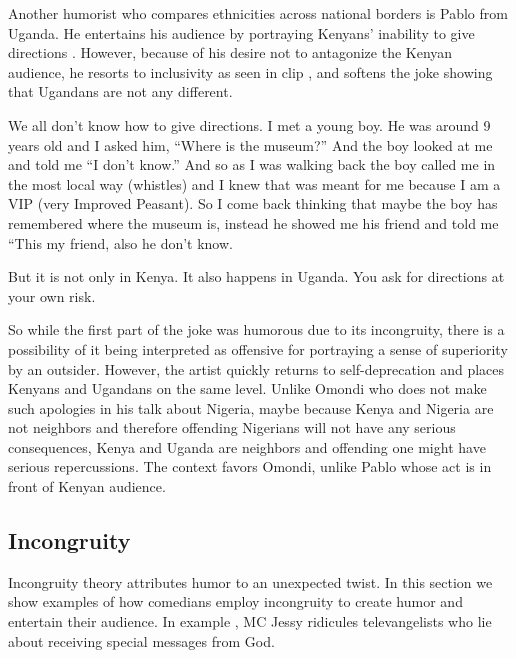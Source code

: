 \documentclass[output=paper]{langsci/langscibook}
\begin{document}
Another humorist who compares ethnicities across national borders is Pablo from Uganda. He entertains his audience by portraying Kenyans’ inability to give directions . However, because of his desire not to antagonize the Kenyan audience, he resorts to inclusivity as seen in clip , and softens the joke showing that Ugandans are not any different.

\ea\label{ex:muaka:6}
We all don’t know how to give directions. I met a young boy. He was around 9 years old and I asked him, “Where is the museum?” And the boy looked at me and told me “I don’t know.” And so as I was walking back the boy called me in the most local way \textup{(whistles)} and I knew that was meant for me because I am a VIP (very Improved Peasant). So I come back thinking that maybe the boy has remembered where the museum is, instead he showed me his friend and told me “This my friend, also he don’t know. 
\citep{Omogi2012}
\z

\ea\label{ex:muaka:7}
 But it is not only in Kenya. It also happens in Uganda. You ask for directions at your own risk. 
 \citep{Omogi2012}
\z

So while the first part of the joke was humorous due to its incongruity, there is a possibility of it being interpreted as offensive for portraying a sense of superiority by an outsider. However, the artist quickly returns to self-deprecation and places Kenyans and Ugandans on the same level. Unlike Omondi who does not make such apologies in his talk about Nigeria, maybe because Kenya and Nigeria are not neighbors and therefore offending Nigerians will not have any serious consequences, Kenya and Uganda are neighbors and offending one might have serious repercussions. The context favors Omondi, unlike Pablo whose act is in front of Kenyan audience.

\subsection{Incongruity}

Incongruity theory attributes humor to an unexpected twist. In this section we show examples of how comedians employ incongruity to create humor and entertain their audience. In example , MC Jessy ridicules televangelists who lie about receiving special messages from God.
\end{document}
